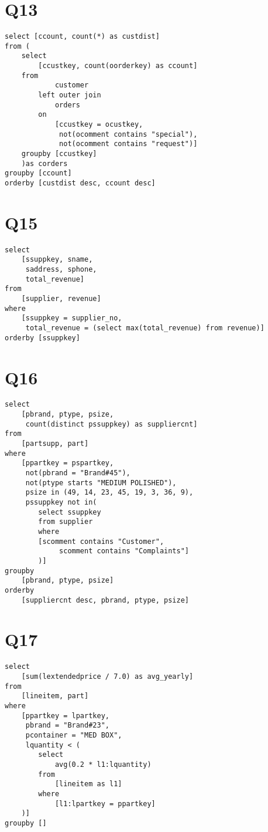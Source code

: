 \newpage

\section*{Q13}
\label{sec:Q13}

\begin{lstlisting}
select [ccount, count(*) as custdist]
from (
	select
		[ccustkey, count(oorderkey) as ccount]
	from
			customer 
		left outer join 
			orders 
		on
			[ccustkey = ocustkey,
			 not(ocomment contains "special"),
			 not(ocomment contains "request")]
	groupby	[ccustkey]
	)as corders
groupby	[ccount]
orderby	[custdist desc,	ccount desc]
\end{lstlisting}

\newpage

\section*{Q15}
\label{sec:Q15}

\begin{lstlisting}
select
	[ssuppkey, sname,
	 saddress, sphone,
	 total_revenue]
from
	[supplier, revenue]
where
	[ssuppkey = supplier_no,
	 total_revenue = (select max(total_revenue)	from revenue)]
orderby [ssuppkey]
\end{lstlisting}

\newpage

\section*{Q16}
\label{sec:Q16}

\begin{lstlisting}
select
	[pbrand, ptype, psize,
	 count(distinct pssuppkey) as suppliercnt]
from
	[partsupp, part]
where
	[ppartkey = pspartkey,
	 not(pbrand = "Brand#45"),
	 not(ptype starts "MEDIUM POLISHED"),
	 psize in (49, 14, 23, 45, 19, 3, 36, 9),
	 pssuppkey not in(
		select ssuppkey
		from supplier
		where
    	[scomment contains "Customer",
			 scomment contains "Complaints"]
		)]
groupby
	[pbrand, ptype, psize]
orderby
	[suppliercnt desc, pbrand, ptype, psize]
\end{lstlisting}

\newpage

\section*{Q17}
\label{sec:Q17}

\begin{lstlisting}
select
	[sum(lextendedprice / 7.0) as avg_yearly]		
from
	[lineitem, part]
where
	[ppartkey = lpartkey,
	 pbrand = "Brand#23",
	 pcontainer = "MED BOX",
	 lquantity < (
		select
			avg(0.2 * l1:lquantity)
		from
			[lineitem as l1]
		where
			[l1:lpartkey = ppartkey]
	)]
groupby	[]
\end{lstlisting}

